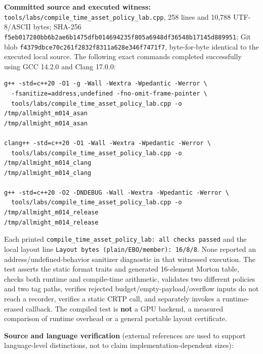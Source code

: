 \textbf{Committed source and executed witness:} \texttt{tools/labs/compile\_time\_asset\_policy\_lab.cpp}, 258 lines and 10,788 UTF-8/ASCII bytes; SHA-256 \texttt{f5eb017280bb6b2ae6b1475dfb014694235f805a6948df36548b17145d889951}; Git blob \texttt{f4379dbce70c261f2832f8311a628e346f7471f7}, byte-for-byte identical to the executed local source. The following exact commands completed successfully using GCC 14.2.0 and Clang 17.0.0:

\begin{verbatim}
g++ -std=c++20 -O1 -g -Wall -Wextra -Wpedantic -Werror \
  -fsanitize=address,undefined -fno-omit-frame-pointer \
  tools/labs/compile_time_asset_policy_lab.cpp -o /tmp/allmight_m014_asan
/tmp/allmight_m014_asan

clang++ -std=c++20 -O1 -Wall -Wextra -Wpedantic -Werror \
  tools/labs/compile_time_asset_policy_lab.cpp -o /tmp/allmight_m014_clang
/tmp/allmight_m014_clang

g++ -std=c++20 -O2 -DNDEBUG -Wall -Wextra -Wpedantic -Werror \
  tools/labs/compile_time_asset_policy_lab.cpp -o /tmp/allmight_m014_release
/tmp/allmight_m014_release
\end{verbatim}

Each printed \texttt{compile\_time\_asset\_policy\_lab:\ all\ checks\ passed} and the local layout line \texttt{Layout\ bytes\ (plain/EBO/member):\ 16/8/8}. None reported an address/undefined-behavior sanitizer diagnostic in that witnessed execution. The test asserts the static format traits and generated 16-element Morton table, checks both runtime and compile-time arithmetic, validates two different policies and two tag paths, verifies rejected budget/empty-payload/overflow inputs do not reach a recorder, verifies a static CRTP call, and separately invokes a runtime-erased callback. The compiled test is \textbf{not} a GPU backend, a measured comparison of runtime overhead or a general portable layout certificate.

\textbf{Source and language verification} (external references are used to support language-level distinctions, not to claim implementation-dependent sizes):

